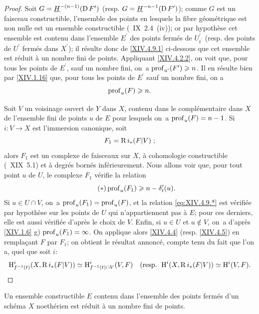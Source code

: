 \begin{proof}
Soit $G=\underline{H}^{-(n-1)}(\operatorname{D} F^{\prime})$ (resp. $G=\underline{H}^{-n-1}(\operatorname{D} F^{\prime})$); comme $G$ est un faisceau constructible, l'ensemble des points en lesquels la fibre g\'eom\'etrique est non nulle est un ensemble constructible (~IX~2.4~\textup{(iv)}); or par hypoth\`ese cet ensemble est contenu dans l'ensemble $E^{\prime}$ des points ferm\'es de $U_{t^{\prime}}^{\prime}$ (resp. des points de $U^{\prime}$ ferm\'es dans $X^{\prime}$); il r\'esulte donc de \ref{XIV.4.9.1} ci-dessous que cet ensemble est r\'eduit \`a un nombre fini de points. Appliquant \ref{XIV.4.2.2}, on voit que, pour tous les points de $E^{\prime}$, sauf un nombre fini, on~a $\operatorname{prof}_{u^{\prime}}(F^{\prime})\geqslant n$. Il en r\'esulte bien par \ref{XIV.1.16} que, pour tous les points de $E^{\prime}$ sauf un nombre fini, on a
$$
\operatorname{prof}_{u}(F)\geqslant n.
$$

Soit $V$ un voisinage ouvert de $Y$ dans $X$, contenu dans le compl\'ementaire dans $X$ de l'ensemble fini de points $u$ de $E$ pour lesquels on~a $\operatorname{prof}_{u}(F)=n-1$. Si $i\colon V\to X$ est l'immersion canonique, soit
$$F_{1}=\operatorname{R} i_{\ast}(F{|V})\;;$$
alors $F_{1}$ est un complexe de faisceaux sur $X$, \`a cohomologie constructible (~XIX~5.1) et \`a degr\'es born\'es inf\'erieurement. Nous allons voir que, pour tout point $u$ de $U$, le complexe $F_{1}$ v\'erifie la relation
\begin{equation*} \label{eq:XIV.4.9.*} \tag{$*$}
\operatorname{prof}_{u}(F_{1})\geqslant n-\delta_{t}^{\prime}(u).
\end{equation*}
Si $u\in U\cap V$, on~a $\operatorname{prof}_{u}(F_{1})=\operatorname{prof}_{u}(F)$, et la
relation \eqref{eq:XIV.4.9.*} est v\'erifi\'ee par hypoth\`ese sur les
points de $U$ qui n'appartiennent pas \`a $E$; pour ces derniers,
elle est aussi v\'erifi\'ee d'apr\`es le choix de $V$. Enfin, si $u\in
U$ et $u\not\in V$, on~a d'apr\`es \ref{XIV.1.6} g)
$\operatorname{prof}_{u}(F_{1})=\infty$. On applique alors \ref{XIV.4.4} (resp.
\ref{XIV.4.5}) en rempla\c cant $F$ par $F_{1}$; on obtient le
r\'esultat annonc\'e, compte tenu du fait que l'on a, quel que soit
$i$:
$$
\operatorname{H}_{f^{-1}(t)}^{i}(X, \operatorname{R} i_{\ast}(F{|V}))\simeq\operatorname{H}_{f^{-1}(t)\cap V}^{i}(V, F)\quad(\textrm{resp. }\operatorname{H}^{i}(X, \operatorname{R} i_{\ast}(F{|V}))\simeq\operatorname{H}^{i}(V, F).
$$
\skipqed
\end{proof}

\begin{sublemme} \label{XIV.4.9.1} Un ensemble constructible $E$ contenu dans l'ensemble des points ferm\'es d'un sch\'ema $X$ noeth\'erien est r\'eduit \`a un nombre fini de points.
\end{sublemme}

